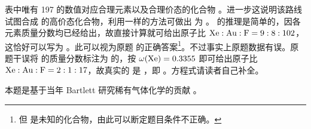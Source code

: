 \documentclass{errata}
\begin{document}
    表中唯有 197 的数值对应合理元素以及合理价态的化合物 。进一步这说明该路线试图合成  的高价态化合物，利用一样的方法可做出  为 。 的推理是简单的，因各元素质量分数均已经给出，故直接计算就可给出原子比 $\ce{Xe}:\ce{Au}:\ce{F}=9:8:102$，这恰好可以写为 。此可以视为原题  的正确答案\footnote{但  是未知的化合物，由此可以断定题目条件不正确。}。不过事实上原题数据有误。原题干误将  的质量分数标注为  的，按 $\omega(\ce{Xe})=0.3355$ 即可给出原子比 $\ce{Xe}:\ce{Au}:\ce{F}=2:1:17$，故真实的  是 ，即 \ce{[Xe2F_{11}][AuF6]}。方程式请读者自己补全。

    本题是基于当年 Bartlett 研究稀有气体化学的贡献 \cite{bartlett1972}。

    \renewcommand{\em}{\itshape}
    \renewcommand*{\bibfont}{\footnotesize}
    \renewcommand{\refname}{参考文献}
    \renewcommand{\bibname}{参考文献}
    \printbibliography
\end{document}
